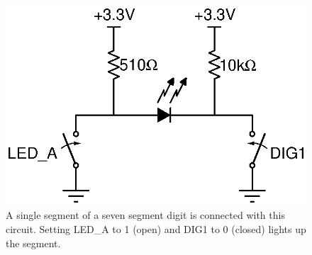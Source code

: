 \begin{figure}[!htb]
	\centering
	\includegraphics{i2cgpio/7SegCircuit.eps}
    \caption{A single segment of a seven segment digit is connected with this circuit. 
        Setting LED\_A to 1 (open) and DIG1 to 0 (closed) lights up the segment.}
    \label{fig:sevensegindcircuit}
\end{figure}